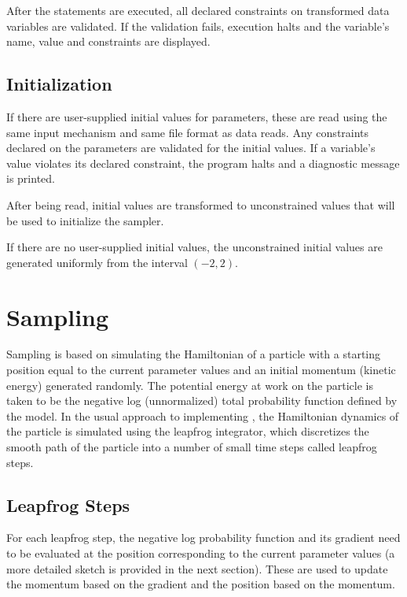 After the statements are executed, all declared constraints on
transformed data variables are validated.  If the validation fails,
execution halts and the variable's name, value and constraints are
displayed.

\subsection{Initialization}

If there are user-supplied initial values for parameters, these are
read using the same input mechanism and same file format as data
reads.  Any constraints declared on the parameters are validated for
the initial values.  If a variable's value violates its declared
constraint, the program halts and a diagnostic message is printed.

After being read, initial values are transformed to unconstrained
values that will be used to initialize the sampler. 

If there are no user-supplied initial values, the unconstrained
initial values are generated uniformly from the interval $(-2,2)$.

\section{Sampling}

Sampling is based on simulating the Hamiltonian of a particle with a
starting position equal to the current parameter values and an initial
momentum (kinetic energy) generated randomly.  The potential energy at
work on the particle is taken to be the negative log (unnormalized) total
probability function defined by the model.  In the usual approach to
implementing \HMC, the Hamiltonian dynamics of the particle is
simulated using the leapfrog integrator, which discretizes the smooth
path of the particle into a number of small time steps called leapfrog
steps.

\subsection{Leapfrog Steps}

For each leapfrog step, the negative log probability function and its
gradient need to be evaluated at the position corresponding to the
current parameter values (a more detailed sketch is provided in the
next section).  These are used to update the momentum based on the
gradient and the position based on the momentum.

